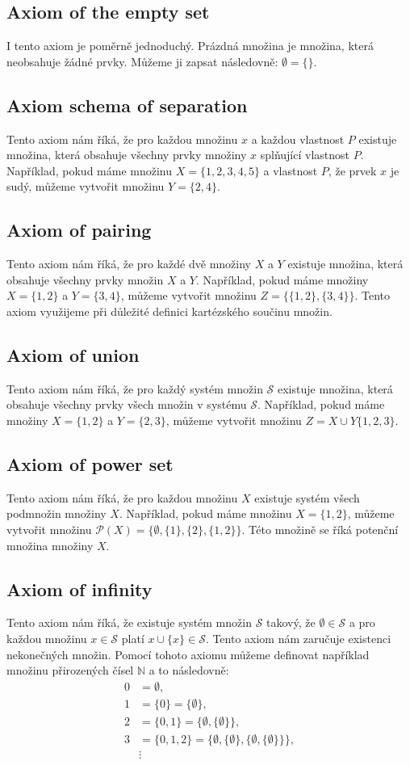 \subsection{Axiom of the empty set}
I tento axiom je poměrně jednoduchý. Prázdná množina je množina, která neobsahuje žádné prvky. Můžeme ji zapsat následovně: $\emptyset = \{\}$.
\subsection{Axiom schema of separation}
Tento axiom nám říká, že pro každou množinu $x$ a každou vlastnost $P$ existuje množina, která obsahuje všechny prvky množiny $x$ splňující vlastnost $P$. Například, pokud máme množinu $X = \{1, 2, 3, 4, 5\}$ a vlastnost $P$, že prvek $x$ je sudý, můžeme vytvořit množinu $Y = \{2, 4\}$.
\subsection{Axiom of pairing}
Tento axiom nám říká, že pro každé dvě množiny $X$ a $Y$ existuje množina, která obsahuje všechny prvky množin $X$ a $Y$. Například, pokud máme množiny $X = \{1, 2\}$ a $Y = \{3, 4\}$, můžeme vytvořit množinu $Z = \{\{1, 2\}, \{3, 4\}\}$. Tento axiom využijeme při důležité definici kartézského součinu množin.
\subsection{Axiom of union}
Tento axiom nám říká, že pro každý systém množin $\mathcal{S}$ existuje množina, která obsahuje všechny prvky všech množin v systému $\mathcal{S}$. Například, pokud máme množiny $X = \{1, 2\}$ a $Y = \{2, 3\}$, můžeme vytvořit množinu $Z = X\cup Y \{1, 2, 3\}$.
\subsection{Axiom of power set}
Tento axiom nám říká, že pro každou množinu $X$ existuje systém všech podmnožin množiny $X$. Například, pokud máme množinu $X = \{1, 2\}$, můžeme vytvořit množinu $\mathcal{P}(X) = \{\emptyset, \{1\}, \{2\}, \{1, 2\}\}$. Této množině se říká potenční množina množiny $X$.
\subsection{Axiom of infinity}
Tento axiom nám říká, že existuje systém množin $\mathcal{S}$ takový, že $\emptyset\in\mathcal{S}$ a pro každou množinu $x\in\mathcal{S}$ platí $x\cup\{x\}\in\mathcal{S}$. Tento axiom nám zaručuje existenci nekonečných množin. Pomocí tohoto axiomu můžeme definovat například množinu přirozených čísel $\mathbb{N}$ a to následovně:
\begin{align*}
  0 &= \emptyset,\\
  1 &= \{0\} = \{\emptyset\},\\
  2 &= \{0, 1\} = \{\emptyset, \{\emptyset\}\},\\
  3 &= \{0, 1, 2\} = \{\emptyset, \{\emptyset\}, \{\emptyset, \{\emptyset\}\}\},\\
  &\vdots
\end{align*}
